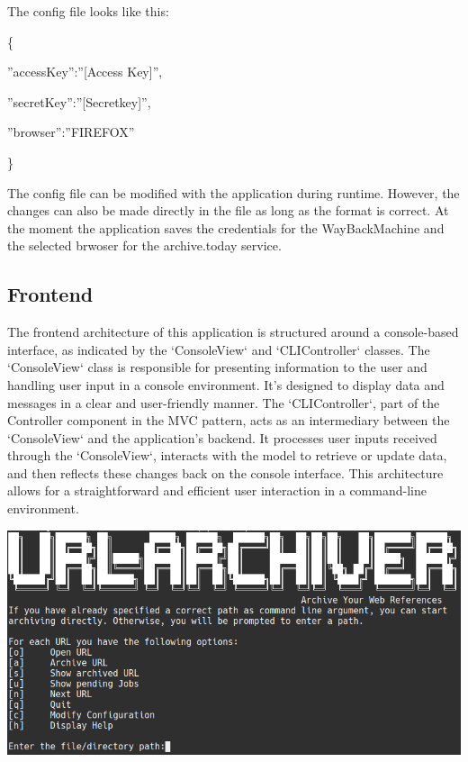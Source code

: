 The config file looks like this:

\{

\quad''accessKey'':''[Access Key]'',

\quad''secretKey'':''[Secretkey]'',

\quad''browser'':''FIREFOX''

\}


The config file can be modified with the application during runtime. However, the changes can also be made directly in the file as long as the format is correct.
At the moment the application saves the credentials for the WayBackMachine and the selected brwoser for the archive.today service.
\clearpage

\subsection{Frontend}
The frontend architecture of this application is structured around a console-based interface, as indicated by the `ConsoleView` and `CLIController` classes. The `ConsoleView` class is responsible for presenting information to the user and handling user input in a console environment. It's designed to display data and messages in a clear and user-friendly manner. The `CLIController`, part of the Controller component in the MVC pattern, acts as an intermediary between the `ConsoleView` and the application's backend. It processes user inputs received through the `ConsoleView`, interacts with the model to retrieve or update data, and then reflects these changes back on the console interface. This architecture allows for a straightforward and efficient user interaction in a command-line environment.
\vskip 1cm
\begin{center}
    \includegraphics[width=1\textwidth]{pictures/final_presentation/command_line_application.jpg}
\end{center}



\clearpage
